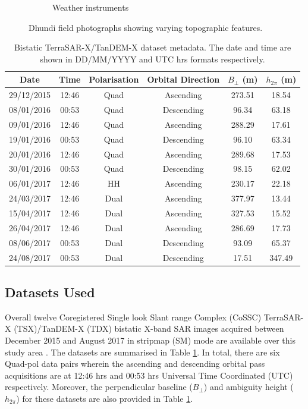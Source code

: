 \documentclass[12pt]{elsarticle}
\numberwithin{equation}{section}
\numberwithin{figure}{section}
\numberwithin{table}{section}
\begin{document}
\begin{figure}[!t]
\begin{subfigure}[t]{0.49\textwidth}
        \caption{Weather instruments}
        \label{subfig:stations}
    \end{subfigure}
    \caption{Dhundi field photographs showing varying topographic features.}
    \label{fig:field}
\end{figure}

\begin{table}[!htbp]
\centering
\caption{\doublespacing Bistatic TerraSAR-X/TanDEM-X dataset metadata. The date and time are shown in DD/MM/YYYY and UTC hrs formats respectively.}
\label{table:data}
\begin{tabular}{c c c c c c}
\hline
\textbf{Date}    & \textbf{Time}   & \textbf{Polarisation}   & \textbf{Orbital Direction}    & \boldmath$B_\bot$ (m) & \boldmath$h_{2\pi}$ (m) \\ \hline
29/12/2015  & 12:46 & Quad  & Ascending & 273.51    & 18.54 \\ 
08/01/2016  & 00:53 & Quad  & Descending    & 96.34 & 63.18 \\ 
09/01/2016  & 12:46 & Quad  & Ascending & 288.29    & 17.61 \\ 
19/01/2016  & 00:53 & Quad  & Descending    & 96.10 & 63.34 \\ 
20/01/2016  & 12:46 & Quad  & Ascending & 289.68    & 17.53 \\ 
30/01/2016  & 00:53 & Quad  & Descending    & 98.15 & 62.02 \\ 
06/01/2017  & 12:46 & HH    & Ascending & 230.17    & 22.18 \\ 
24/03/2017  & 12:46 & Dual  & Ascending & 377.97    & 13.44 \\
15/04/2017  & 12:46 & Dual  & Ascending & 327.53    & 15.52 \\
26/04/2017  & 12:46 & Dual  & Ascending  & 286.69   & 17.73 \\
08/06/2017  & 00:53 & Dual  & Descending    & 93.09 & 65.37 \\
24/08/2017  & 00:53 & Dual  & Descending    & 17.51 & 347.49 \\ \hline
\end{tabular}
\end{table}

\subsection{Datasets Used}
\label{ssec:data}
Overall twelve Coregistered Single look Slant range Complex (CoSSC) TerraSAR-X (TSX)/TanDEM-X (TDX) bistatic X-band SAR images acquired between December 2015 and August 2017 in stripmap (SM) mode are available over this study area \citep{Balss2012}. The datasets are summarised in Table \ref{table:data}. In total, there are six Quad-pol data pairs wherein the ascending and descending orbital pass acquisitions are at 12:46 hrs and 00:53 hrs Universal Time Coordinated (UTC) respectively. Moreover, the perpendicular baseline ($B_\bot$) and ambiguity height ($h_{2\pi}$) for these datasets are also provided in Table \ref{table:data}. 
\end{document}
